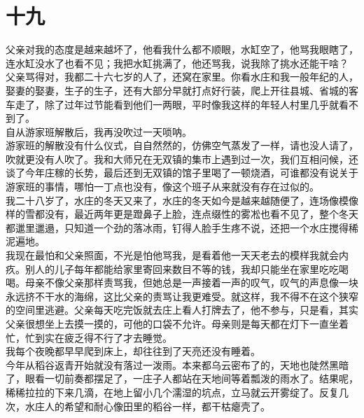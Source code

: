 \fancyhead[RO]{\thepage} %
\fancyhead[LE]{\thepage} %
\fancyfoot[LE,RO]{}
\fancyfoot[LO,CE]{}
\fancyfoot[CO,RE]{}
\chapter*{十九}
父亲对我的态度是越来越坏了，他看我什么都不顺眼，水缸空了，他骂我眼瞎了，连水缸没水了也看不见；我把水缸挑满了，他还骂我，说我除了挑水还能干啥？\\

父亲骂得对，我都二十六七岁的人了，还窝在家里。你看水庄和我一般年纪的人，娶妻的娶妻，生子的生子，还有大部分早就打点好行装，爬上开往县城、省城的客车走了，除了过年过节能看到他们一两眼，平时像我这样的年轻人村里几乎就看不到了。\\

自从游家班解散后，我再没吹过一天唢呐。\\

游家班的解散没有什么仪式，自自然然的，仿佛空气蒸发了一样，请也没人请了，吹就更没有人吹了。我和大师兄在无双镇的集市上遇到过一次，我们互相问候，还谈了今年庄稼的长势，最后还到无双镇的馆子里喝了一顿烧酒，可谁都没有说关于游家班的事情，哪怕一丁点也没有，像这个班子从来就没有存在过似的。\\

我二十八岁了，水庄的冬天又来了，水庄的冬天如今是越来越随便了，连场像模像样的雪都没有，最近两年更是蹬鼻子上脸，连点缀性的雾凇也看不见了，整个冬天都邋里邋遢，只知道一个劲的落冰雨，钉得人脸手生疼不说，还把一个水庄搅得稀泥遍地。\\

我现在最怕和父亲照面，不光是怕他骂我，是看着他一天天老去的模样我就会内疚。别人的儿子每年都能给家里寄回来数目不等的钱，我却只能坐在家里吃吃喝喝。母亲不像父亲那样责骂我，但她总是一声接着一声的叹气，叹气的声息像一块永远挤不干水的海绵，这比父亲的责骂让我更难受。就这样，我不得不在这个狭窄的空间里逃避。父亲每天吃完饭就去庄上看人打牌去了，他不参与，只是看，其实父亲很想坐上去摸一摸的，可他的口袋不允许。母亲则是每天都在灯下一直坐着忙，忙到实在疲乏得不行了才去睡觉。\\

我每个夜晚都早早爬到床上，却往往到了天亮还没有睡着。\\

今年从稻谷返青开始就没有落过一泼雨。本来都乌云密布了的，天地也陡然黑暗了，眼看一切前奏都摆足了，一庄子人都站在天地间等着瓢泼的雨水了。结果呢，稀稀拉拉的下来几滴，在地上留小几个濡湿的坑点，立马就云开雾绽了。反复几次，水庄人的希望和耐心像田里的稻谷一样，都干枯瘪壳了。\\

